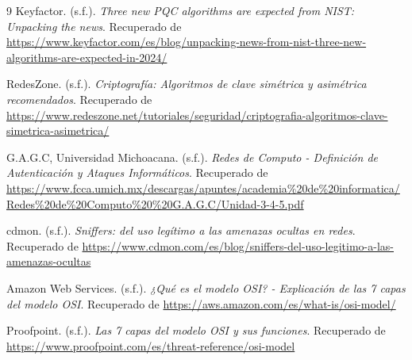 \documentclass[a4paper,12pt]{article}
\begin{document}
\begin{thebibliography}{9}
     Keyfactor. (s.f.). \textit{Three new PQC algorithms are expected from NIST: Unpacking the news}. Recuperado de \url{https://www.keyfactor.com/es/blog/unpacking-news-from-nist-three-new-algorithms-are-expected-in-2024/}

     RedesZone. (s.f.). \textit{Criptografía: Algoritmos de clave simétrica y asimétrica recomendados}. Recuperado de \url{https://www.redeszone.net/tutoriales/seguridad/criptografia-algoritmos-clave-simetrica-asimetrica/}

     G.A.G.C, Universidad Michoacana. (s.f.). \textit{Redes de Computo - Definición de Autenticación y Ataques Informáticos}. Recuperado de \url{https://www.fcca.umich.mx/descargas/apuntes/academia\%20de\%20informatica/Redes\%20de\%20Computo\%20\%20G.A.G.C/Unidad-3-4-5.pdf}

     cdmon. (s.f.). \textit{Sniffers: del uso legítimo a las amenazas ocultas en redes}. Recuperado de \url{https://www.cdmon.com/es/blog/sniffers-del-uso-legitimo-a-las-amenazas-ocultas}

     Amazon Web Services. (s.f.). \textit{¿Qué es el modelo OSI? - Explicación de las 7 capas del modelo OSI}. Recuperado de \url{https://aws.amazon.com/es/what-is/osi-model/}

     Proofpoint. (s.f.). \textit{Las 7 capas del modelo OSI y sus funciones}. Recuperado de \url{https://www.proofpoint.com/es/threat-reference/osi-model}

\end{thebibliography}
\end{document}
